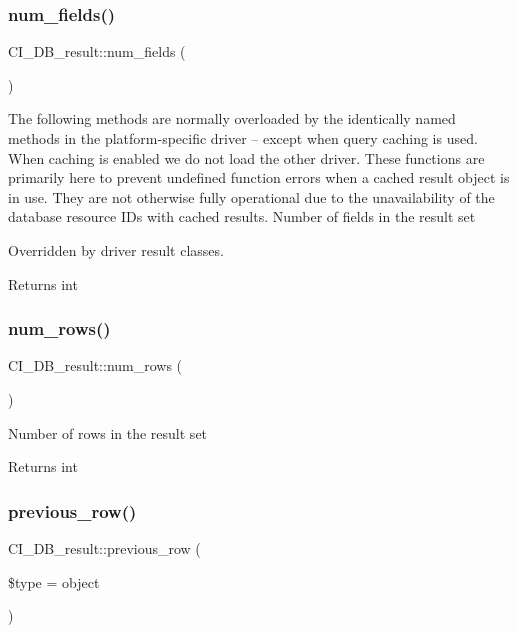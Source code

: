 \subsubsection{\texorpdfstring{num\+\_\+fields()}{num\_fields()}}
{\footnotesize\ttfamily C\+I\+\_\+\+D\+B\+\_\+result\+::num\+\_\+fields (\begin{DoxyParamCaption}{ }\end{DoxyParamCaption})}

The following methods are normally overloaded by the identically named methods in the platform-\/specific driver -- except when query caching is used. When caching is enabled we do not load the other driver. These functions are primarily here to prevent undefined function errors when a cached result object is in use. They are not otherwise fully operational due to the unavailability of the database resource I\+Ds with cached results. Number of fields in the result set

Overridden by driver result classes.

\begin{DoxyReturn}{Returns}
int 
\end{DoxyReturn}
\mbox{\label{class_c_i___d_b__result_ae2c1d61b95abfa23fa5df84f62d324d3}} 
\subsubsection{\texorpdfstring{num\+\_\+rows()}{num\_rows()}}
{\footnotesize\ttfamily C\+I\+\_\+\+D\+B\+\_\+result\+::num\+\_\+rows (\begin{DoxyParamCaption}{ }\end{DoxyParamCaption})}

Number of rows in the result set

\begin{DoxyReturn}{Returns}
int 
\end{DoxyReturn}
\mbox{\label{class_c_i___d_b__result_abb6c9f105683b802fbdaf56f11d9ea1a}} 
\subsubsection{\texorpdfstring{previous\+\_\+row()}{previous\_row()}}
{\footnotesize\ttfamily C\+I\+\_\+\+D\+B\+\_\+result\+::previous\+\_\+row (\begin{DoxyParamCaption}\item[{}]{\$type = {\ttfamily \textquotesingle{}object\textquotesingle{}} }\end{DoxyParamCaption})}

